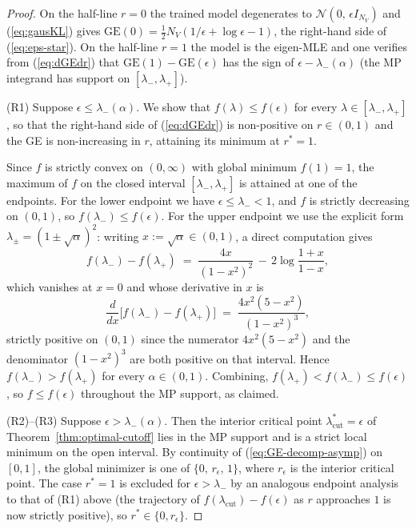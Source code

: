 \documentclass[11pt,a4paper]{article}
\theoremstyle{definition}
\theoremstyle{remark}
\newcommand{\NV}{N_V}
\begin{document}
\begin{proof}
On the half-line $r = 0$ the trained model degenerates to
$\mathcal{N}(0,\, \epsilon I_{\NV})$ and (\ref{eq:gausKL}) gives
$\mathrm{GE}(0) = \tfrac{1}{2}\NV(1/\epsilon + \log\epsilon - 1)$,
the right-hand side of (\ref{eq:eps-star}). On the half-line
$r = 1$ the model is the eigen-MLE and one verifies from
(\ref{eq:dGEdr}) that
$\mathrm{GE}(1) - \mathrm{GE}(\epsilon)$ has the sign of
$\epsilon - \lambda_{-}(\alpha)$ (the MP integrand has support
on $[\lambda_{-},\lambda_{+}]$).

(R1) Suppose $\epsilon \leq \lambda_{-}(\alpha)$. We show that
$f(\lambda) \leq f(\epsilon)$ for every $\lambda \in
[\lambda_{-}, \lambda_{+}]$, so that the right-hand side of
(\ref{eq:dGEdr}) is non-positive on $r \in (0,1)$ and the GE is
non-increasing in $r$, attaining its minimum at $r^{*} = 1$.

Since $f$ is strictly convex on $(0, \infty)$ with global
minimum $f(1) = 1$, the maximum of $f$ on the closed interval
$[\lambda_{-}, \lambda_{+}]$ is attained at one of the
endpoints. For the lower endpoint we have $\epsilon \leq
\lambda_{-} < 1$, and $f$ is strictly decreasing on $(0, 1)$,
so $f(\lambda_{-}) \leq f(\epsilon)$. For the upper endpoint
we use the explicit form $\lambda_{\pm} = (1 \pm \sqrt{\alpha})^{2}$:
writing $x := \sqrt{\alpha} \in (0, 1)$, a direct computation
gives
\begin{equation*}
  f(\lambda_{-}) - f(\lambda_{+})
  \;=\;
  \frac{4x}{(1-x^{2})^{2}}
  \,-\, 2\log\!\frac{1+x}{1-x},
\end{equation*}
which vanishes at $x = 0$ and whose derivative in $x$ is
\begin{equation*}
  \frac{d}{dx}\bigl[f(\lambda_{-}) - f(\lambda_{+})\bigr]
  \;=\;
  \frac{4x^{2}(5 - x^{2})}{(1 - x^{2})^{3}},
\end{equation*}
strictly positive on $(0, 1)$ since the numerator
$4x^{2}(5 - x^{2})$ and the denominator $(1 - x^{2})^{3}$ are
both positive on that interval. Hence
$f(\lambda_{-}) > f(\lambda_{+})$ for every
$\alpha \in (0, 1)$. Combining, $f(\lambda_{+}) <
f(\lambda_{-}) \leq f(\epsilon)$, so $f \leq f(\epsilon)$
throughout the MP support, as claimed.

(R2)--(R3) Suppose $\epsilon > \lambda_{-}(\alpha)$. Then the
interior critical point $\lambda_{\mathrm{cut}}^{*} = \epsilon$
of Theorem~\ref{thm:optimal-cutoff} lies in the MP support and
is a strict local minimum on the open interval. By continuity
of (\ref{eq:GE-decomp-asymp}) on $[0,1]$, the global minimizer
is one of $\{0,\, r_{\epsilon},\, 1\}$, where $r_{\epsilon}$
is the interior critical point. The case $r^{*} = 1$ is
excluded for $\epsilon > \lambda_{-}$ by an analogous endpoint
analysis to that of (R1) above (the trajectory of
$f(\lambda_{\mathrm{cut}}) - f(\epsilon)$ as $r$ approaches $1$
is now strictly positive), so $r^{*} \in \{0, r_{\epsilon}\}$.


\end{proof}
\end{document}
